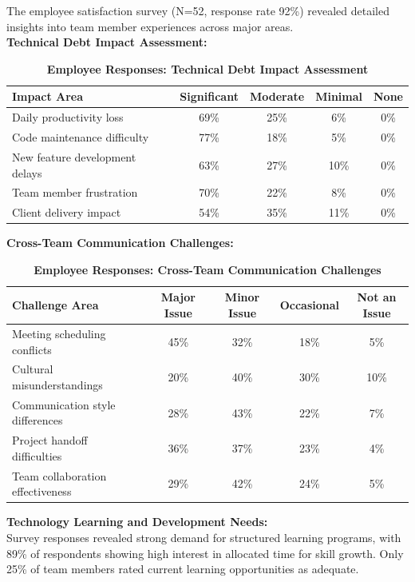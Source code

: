 \documentclass[12pt,a4paper,oneside]{book}
\begin{document}
The employee satisfaction survey (N=52, response rate 92\%) revealed detailed insights into team member experiences across major areas.\\

\textbf{Technical Debt Impact Assessment:}
\begin{table}[H]
\centering
\caption{\textbf{Employee Responses: Technical Debt Impact Assessment}}
\begin{tabular}{|l|c|c|c|c|}
\hline
Impact Area & Significant & Moderate & Minimal & None \\
\hline
Daily productivity loss & 69\% & 25\% & 6\% & 0\% \\
Code maintenance difficulty & 77\% & 18\% & 5\% & 0\% \\
New feature development delays & 63\% & 27\% & 10\% & 0\% \\
Team member frustration & 70\% & 22\% & 8\% & 0\% \\
Client delivery impact & 54\% & 35\% & 11\% & 0\% \\
\hline
\end{tabular}
\end{table}

\textbf{Cross-Team Communication Challenges:}
\begin{table}[H]
\centering
\caption{\textbf{Employee Responses: Cross-Team Communication Challenges}}
\begin{tabular}{|l|c|c|c|c|}
\hline
Challenge Area & Major Issue & Minor Issue & Occasional & Not an Issue \\
\hline
Meeting scheduling conflicts & 45\% & 32\% & 18\% & 5\% \\
Cultural misunderstandings & 20\% & 40\% & 30\% & 10\% \\
Communication style differences & 28\% & 43\% & 22\% & 7\% \\
Project handoff difficulties & 36\% & 37\% & 23\% & 4\% \\
Team collaboration effectiveness & 29\% & 42\% & 24\% & 5\% \\
\hline
\end{tabular}
\end{table}

\textbf{Technology Learning and Development Needs:}\\

Survey responses revealed strong demand for structured learning programs, with 89\% of respondents showing high interest in allocated time for skill growth. Only 25\% of team members rated current learning opportunities as adequate.\\
\end{document}
